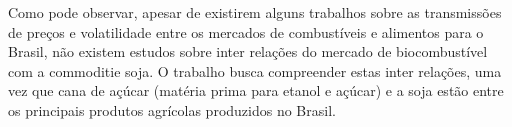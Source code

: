 \documentclass[a4paper,12pt] {article}
\begin{document}
	Como pode observar, apesar de existirem alguns trabalhos sobre as transmissões de preços e volatilidade entre os mercados de combustíveis e alimentos para o Brasil, não existem estudos sobre inter relações do mercado de biocombustível com a commoditie soja. O trabalho busca compreender estas inter relações, uma vez que cana de açúcar (matéria prima para etanol e açúcar) e a soja estão entre os principais produtos agrícolas produzidos no Brasil. 
	
	
	

	
	
\end{document}
